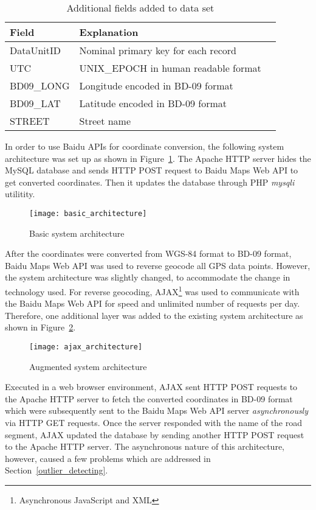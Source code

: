 \begin{table}
\centering
\begin{tabular}{ | l | l | l | }
\hline
\textbf{Field} & \textbf{Explanation} \\ \hline
DataUnitID & Nominal primary key for each record \\ \hline
UTC & UNIX\_EPOCH in human readable format \\ \hline
BD09\_LONG & Longitude encoded in BD-09 format\\ \hline
BD09\_LAT & Latitude encoded in BD-09 format\\ \hline
STREET & Street name\\ \hline
\end{tabular}
\caption{Additional fields added to data set}\label{Ta:addtional_field}
\end{table}

In order to use Baidu APIs for coordinate conversion, the following system architecture was set up as shown in Figure~\ref{Fig:basic_architecture}. The Apache HTTP server hides the MySQL database and sends HTTP POST request to Baidu Maps Web API to get converted coordinates. Then it updates the database through PHP \emph{mysqli} utilitity. 

\begin{figure}[h]
\texttt{[image: basic\_architecture]}
\centering
\caption{Basic system architecture}\label{Fig:basic_architecture}
\end{figure}

After the coordinates were converted from WGS-84 format to BD-09 format, Baidu Maps Web API was used to reverse geocode all GPS data points. However, the system architecture was slightly changed, to accommodate the change in technology used. For reverse geocoding, AJAX\footnote{Asynchronous JavaScript and XML} was used to communicate with the Baidu Maps Web API for speed and unlimited number of requests per day. Therefore, one additional layer was added to the existing system architecture as shown in Figure~\ref{Fig:ajax_architecture}. 

\begin{figure}[h]
\texttt{[image: ajax\_architecture]}
\centering
\caption{Augmented system architecture}\label{Fig:ajax_architecture}
\end{figure}

Executed in a web browser environment, AJAX sent HTTP POST requests to the Apache HTTP server to fetch the converted coordinates in BD-09 format which were subsequently sent to the Baidu Maps Web API server \emph{asynchronously} via HTTP GET requests. Once the server responded with the name of the road segment, AJAX updated the database by sending another HTTP POST request to the Apache HTTP server. The asynchronous nature of this architecture, however, caused a few problems which are addressed in Section~\ref{outlier_detecting}. 

